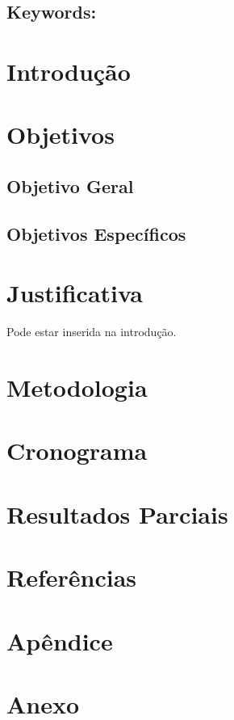 \documentclass[12pt]{article}
\begin{document}
\subsection*{Keywords: }

\pagebreak

\tableofcontents
\newpage
\listoftables %
\newpage
\listoffigures %
\newpage

\section{Introdução}\label{sec:intro}

\section{Objetivos}
\subsection{Objetivo Geral}
\subsection{Objetivos Específicos}

\section{Justificativa}
Pode estar inserida na introdução.

\section{Metodologia}

\section{Cronograma}

\section{Resultados Parciais}

\section{Referências}

\section*{Apêndice}

\section*{Anexo}
\end{document}
